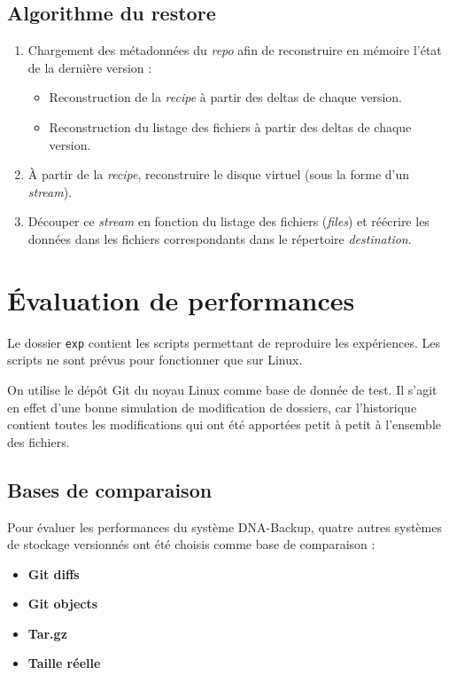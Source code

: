 \documentclass[a4paper]{report}
\begin{document}
\section{Algorithme du restore}

\begin{enumerate}
\item
  Chargement des métadonnées du \emph{repo} afin de reconstruire en
  mémoire l'état de la dernière version :

  \begin{itemize}
  \item
    Reconstruction de la \emph{recipe} à partir des deltas de chaque
    version.
  \item
    Reconstruction du listage des fichiers à partir des deltas de chaque
    version.
  \end{itemize}
\item
  À partir de la \emph{recipe}, reconstruire le disque virtuel (sous la
  forme d'un \emph{stream}).
\item
  Découper ce \emph{stream} en fonction du listage des fichiers
  (\emph{files}) et réécrire les données dans les fichiers
  correspondants dans le répertoire \emph{destination}.
\end{enumerate}



\chapter{Évaluation de performances}

Le dossier \verb|exp| contient les scripts permettant de reproduire
les expériences. Les scripts ne sont prévus pour fonctionner que sur
Linux.

On utilise le dépôt Git du noyau Linux comme base de donnée de test. Il
s'agit en effet d'une bonne simulation de modification de dossiers, car
l'historique contient toutes les modifications qui ont été apportées
petit à petit à l'ensemble des fichiers.

\section{Bases de comparaison}

Pour évaluer les performances du système DNA-Backup, quatre autres
systèmes de stockage versionnés ont été choisis comme base de
comparaison :

\begin{itemize}
\item
  \textbf{Git diffs}
\item
  \textbf{Git objects}
\item
  \textbf{Tar.gz}
\item
  \textbf{Taille réelle}
\end{itemize}
\end{document}
